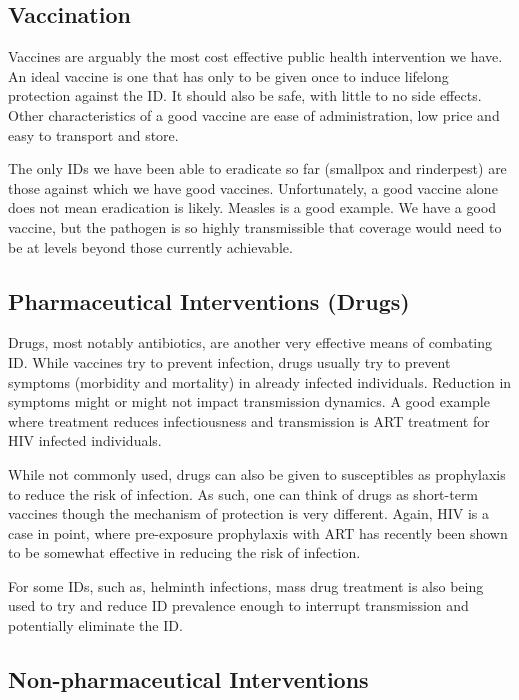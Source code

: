 \documentclass[]{book}
\theoremstyle{definition}
\theoremstyle{definition}
\theoremstyle{definition}
\theoremstyle{remark}
\begin{document}
\subsection{Vaccination}\label{vaccination}

Vaccines are arguably the most cost effective public health intervention
we have. An ideal vaccine is one that has only to be given once to
induce lifelong protection against the ID. It should also be safe, with
little to no side effects. Other characteristics of a good vaccine are
ease of administration, low price and easy to transport and store.

The only IDs we have been able to eradicate so far (smallpox and
rinderpest) are those against which we have good vaccines.
Unfortunately, a good vaccine alone does not mean eradication is likely.
Measles is a good example. We have a good vaccine, but the pathogen is
so highly transmissible that coverage would need to be at levels beyond
those currently achievable.

\subsection{Pharmaceutical Interventions
(Drugs)}\label{pharmaceutical-interventions-drugs}

Drugs, most notably antibiotics, are another very effective means of
combating ID. While vaccines try to prevent infection, drugs usually try
to prevent symptoms (morbidity and mortality) in already infected
individuals. Reduction in symptoms might or might not impact
transmission dynamics. A good example where treatment reduces
infectiousness and transmission is ART treatment for HIV infected
individuals.

While not commonly used, drugs can also be given to susceptibles as
prophylaxis to reduce the risk of infection. As such, one can think of
drugs as short-term vaccines though the mechanism of protection is very
different. Again, HIV is a case in point, where pre-exposure prophylaxis
with ART has recently been shown to be somewhat effective in reducing
the risk of infection.

For some IDs, such as, helminth infections, mass drug treatment is also
being used to try and reduce ID prevalence enough to interrupt
transmission and potentially eliminate the ID.

\subsection{Non-pharmaceutical
Interventions}\label{non-pharmaceutical-interventions}
\end{document}
